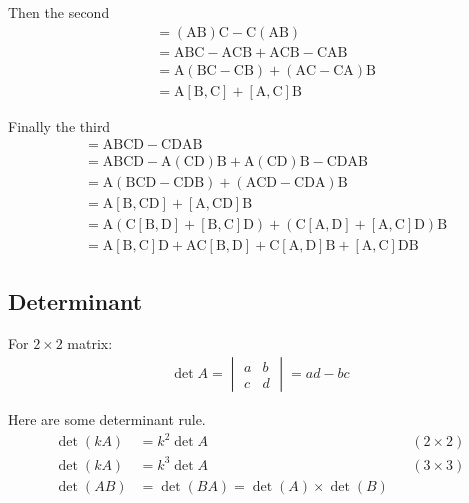 \documentclass[../../../main.tex]{subfiles}
\begin{document}
Then the second
\begin{align*}
[\mathrm{A}\mathrm{B},\mathrm{C}]&=  (\mathrm{A}\mathrm{B})\mathrm{C} - \mathrm{C}(\mathrm{A}\mathrm{B})\\
&=  \mathrm{A}\mathrm{B}\mathrm{C} - \mathrm{A}\mathrm{C}\mathrm{B} + \mathrm{A}\mathrm{C}\mathrm{B} - \mathrm{C}\mathrm{A}\mathrm{B}\\
&=  \mathrm{A}(\mathrm{B}\mathrm{C} - \mathrm{C}\mathrm{B}) + (\mathrm{A}\mathrm{C} - \mathrm{C}\mathrm{A})\mathrm{B}\\
&=  \mathrm{A}[\mathrm{B},\mathrm{C}] + [\mathrm{A},\mathrm{C}]\mathrm{B}
\end{align*}

Finally the third 
\begin{align*}
[\mathrm{A}\mathrm{B},\mathrm{C}\mathrm{D}] &=  \mathrm{A}\mathrm{B}\mathrm{C}\mathrm{D} - \mathrm{C}\mathrm{D}\mathrm{A}\mathrm{B}\\
&=  \mathrm{A}\mathrm{B}\mathrm{C}\mathrm{D} - \mathrm{A}(\mathrm{C}\mathrm{D})\mathrm{B} + \mathrm{A}(\mathrm{C}\mathrm{D})\mathrm{B} - \mathrm{C}\mathrm{D}\mathrm{A}\mathrm{B}\\
&=  \mathrm{A}(\mathrm{B}\mathrm{C}\mathrm{D} - \mathrm{C}\mathrm{D}\mathrm{B}) + (\mathrm{A}\mathrm{C}\mathrm{D} - \mathrm{C}\mathrm{D}\mathrm{A})\mathrm{B}\\
&= \mathrm{A}[\mathrm{B},\mathrm{C}\mathrm{D}] + [\mathrm{A},\mathrm{C}\mathrm{D}]\mathrm{B}\\
&=  \mathrm{A}(\mathrm{C}[\mathrm{B},\mathrm{D}] + [\mathrm{B},\mathrm{C}]\mathrm{D}) + (\mathrm{C}[\mathrm{A},\mathrm{D}] + [\mathrm{A},\mathrm{C}]\mathrm{D})\mathrm{B}\\
&= \mathrm{A}[\mathrm{B}, \mathrm{C}]\mathrm{D} + \mathrm{A}\mathrm{C}[\mathrm{B}, \mathrm{D}] + \mathrm{C}[\mathrm{A}, \mathrm{D}]\mathrm{B} + [{\mathrm{A}}, \mathrm{C}]\mathrm{D}\mathrm{B}
\end{align*}

\subsection{Determinant} For $2\times 2$ matrix:
\begin{align*}
	\det A=\begin{vmatrix}
		       a & b \\
		       c & d
	       \end{vmatrix}=ad-bc
\end{align*}

Here are some determinant rule.
\begin{align*}
	\det(kA) & =k^2\det A                      &  & (2\times2) \\
	\det(kA) & =k^3\det A                      &  & (3\times3) \\
	\det(AB) & =\det(BA)=\det(A)\times\det (B)
\end{align*}
\end{document}
